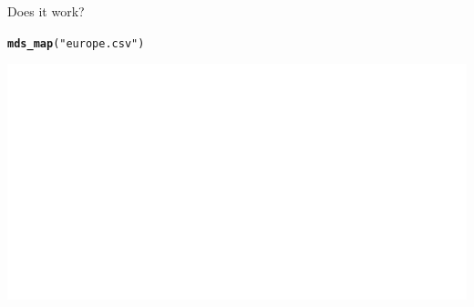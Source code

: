 \documentclass[unknownkeysallowed]{beamer}\usepackage[]{graphicx}\usepackage[]{color}
\makeatletter
\def\maxwidth{ %
  \ifdim\Gin@nat@width>\linewidth
    \linewidth
  \else
    \Gin@nat@width
  \fi
}
\newcommand{\hlstr}[1]{\textcolor[rgb]{0.192,0.494,0.8}{#1}}%
\newcommand{\hlstd}[1]{\textcolor[rgb]{0.345,0.345,0.345}{#1}}%
\newcommand{\hlkwd}[1]{\textcolor[rgb]{0.737,0.353,0.396}{\textbf{#1}}}%
\newenvironment{kframe}{%
 \def\at@end@of@kframe{}%
 \ifinner\ifhmode%
  \def\at@end@of@kframe{\end{minipage}}%
  \begin{minipage}{\columnwidth}%
 \fi\fi%
 \def\FrameCommand##1{\hskip\@totalleftmargin \hskip-\fboxsep
 \colorbox{shadecolor}{##1}\hskip-\fboxsep
     \hskip-\linewidth \hskip-\@totalleftmargin \hskip\columnwidth}%
 \MakeFramed {\advance\hsize-\width
   \@totalleftmargin\z@ \linewidth\hsize
   \@setminipage}}%
 {\par\unskip\endMakeFramed%
 \at@end@of@kframe}
\newenvironment{knitrout}{}{} %
\makeatother
\begin{document}
\begin{frame}[fragile]{Does it work?}
  
\begin{knitrout}
\color{fgcolor}\begin{kframe}
\begin{alltt}
\hlkwd{mds_map}\hlstd{(}\hlstr{"europe.csv"}\hlstd{)}
\end{alltt}
\end{kframe}
\includegraphics[width=\maxwidth]{figure/unnamed-chunk-390-1} 

\end{knitrout}
  
\end{frame}
\end{document}
